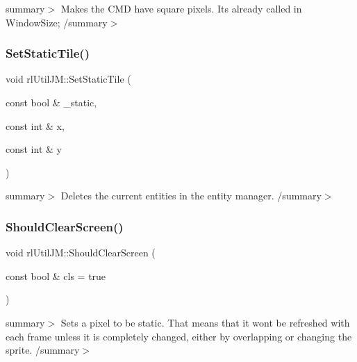 summary$>$ Makes the C\+MD have square pixels. It\textquotesingle{}s already called in Window\+Size; /summary$>$ \mbox{\label{classrl_util_j_m_a90e0883ca7f6dd2063fcde3480830808}} 
\subsubsection{\texorpdfstring{Set\+Static\+Tile()}{SetStaticTile()}}
{\footnotesize\ttfamily void rl\+Util\+J\+M\+::\+Set\+Static\+Tile (\begin{DoxyParamCaption}\item[{const bool \&}]{\+\_\+static,  }\item[{const int \&}]{x,  }\item[{const int \&}]{y }\end{DoxyParamCaption})\hspace{0.3cm}{\ttfamily [static]}}

summary$>$ Deletes the current entities in the entity manager. /summary$>$ \mbox{\label{classrl_util_j_m_a78f6a6c06bce80e04fe3df7d6ba38afe}} 
\subsubsection{\texorpdfstring{Should\+Clear\+Screen()}{ShouldClearScreen()}}
{\footnotesize\ttfamily void rl\+Util\+J\+M\+::\+Should\+Clear\+Screen (\begin{DoxyParamCaption}\item[{const bool \&}]{cls = {\ttfamily true} }\end{DoxyParamCaption})\hspace{0.3cm}{\ttfamily [static]}}

summary$>$ Sets a pixel to be static. That means that it wont be refreshed with each frame unless it is completely changed, either by overlapping or changing the sprite. /summary$>$ \mbox{\label{classrl_util_j_m_a367f3a8c8eaed42854a775dd8be511a4}} 
